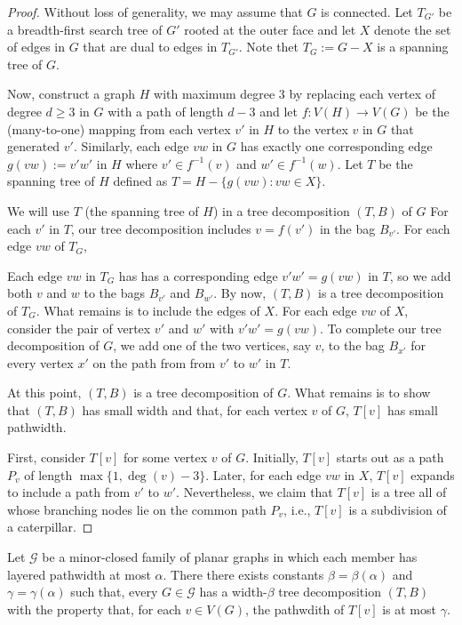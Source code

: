 \documentclass{patmorin}
\DeclareMathOperator{\degree}{deg}
\begin{document}
\begin{proof}
  Without loss of generality, we may assume that $G$ is connected.
  Let $T_{G'}$ be a breadth-first search tree of $G'$ rooted at the
  outer face and let $X$ denote the set of edges in $G$ that are dual
  to edges in $T_{G'}$. Note thet $T_G:=G-X$ is a spanning tree of $G$.

  Now, construct a graph $H$ with maximum degree 3 by replacing each
  vertex of degree $d\ge 3$ in $G$ with a path of length $d-3$ and let
  $f:V(H)\to V(G)$ be the (many-to-one) mapping from each vertex $v'$
  in $H$ to the vertex $v$ in $G$ that generated $v'$. Similarly, each
  edge $vw$ in $G$ has exactly one corresponding edge $g(vw):=v'w'$
  in $H$ where $v'\in f^{-1}(v)$ and $w'\in f^{-1}(w)$.  Let $T$ be the
  spanning tree of $H$ defined as $T=H-\{g(vw):vw\in X\}$.

  We will use $T$ (the spanning tree of $H$) in a tree decomposition
  $(T,B)$ of $G$ For each $v'$ in $T$, our tree decomposition includes
  $v=f(v')$ in the bag $B_{v'}$.  For each edge $vw$ of $T_G$,

  Each edge $vw$ in $T_G$ has has a corresponding edge $v'w'=g(vw)$
  in $T$, so we add both $v$ and $w$ to the bags $B_{v'}$ and $B_{w'}$.
  By now, $(T,B)$ is a tree decomposition of $T_G$.  What remains is to
  include  the edges of $X$.  For each edge $vw$ of $X$, consider
  the pair of vertex $v'$ and $w'$ with $v'w'=g(vw)$.  To complete our
  tree decomposition of $G$, we add one of the two vertices, say $v$,
  to the bag $B_{x'}$ for every vertex $x'$ on the path from from $v'$
  to $w'$ in $T$.

  At this point, $(T,B)$ is a tree decomposition of $G$. What remains
  is to show that $(T,B)$ has small width and that, for each vertex $v$
  of $G$, $T[v]$ has small pathwidth.

  First, consider $T[v]$ for some vertex $v$ of $G$. Initially, $T[v]$
  starts out as a path $P_v$ of length $\max\{1,\degree(v)-3\}$.  Later,
  for each edge $vw$ in $X$, $T[v]$ expands to include a path from $v'$
  to $w'$.  Nevertheless, we claim that $T[v]$ is a tree all of whose
  branching nodes lie on the common path $P_v$, i.e., $T[v]$ is a
  subdivision of a caterpillar.
\end{proof}

\begin{thm}
  Let $\mathcal{G}$ be a minor-closed family of planar graphs in which
  each member has layered pathwidth at most $\alpha$.
  There there exists constants $\beta=\beta(\alpha)$ and $\gamma=\gamma(\alpha)$
  such that, every $G\in \mathcal{G}$ has a width-$\beta$ tree decomposition
  $(T,B)$ with the property that, for each $v\in V(G)$, the pathwdith
  of $T[v]$ is at most $\gamma$.
\end{thm}
\end{document}

